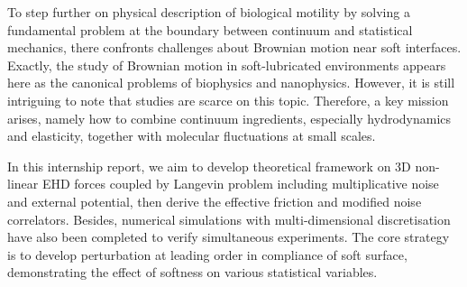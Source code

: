 \documentclass[fleqn,10pt]{InternshipReport-ENS-PSL}
\begin{document}
To step further on physical description of biological motility by solving a fundamental problem at the boundary between continuum and statistical mechanics, there confronts challenges about Brownian motion near soft interfaces.
Exactly, the study of Brownian motion in soft-lubricated environments appears here as the canonical problems of biophysics and nanophysics. %
However, it is still intriguing to note that studies are scarce on this topic. 
Therefore, a key mission arises, namely how to combine continuum ingredients, especially hydrodynamics and elasticity, together with molecular fluctuations at small scales. %

In this internship report, we aim to develop theoretical framework on 3D non-linear EHD forces coupled by Langevin problem including multiplicative noise and external potential, then derive the effective friction and modified noise correlators. %
Besides, numerical simulations with multi-dimensional discretisation have also been completed to verify simultaneous experiments. The core strategy is to develop perturbation at leading order in compliance of soft surface, demonstrating the effect of softness on various statistical variables.
\end{document}
